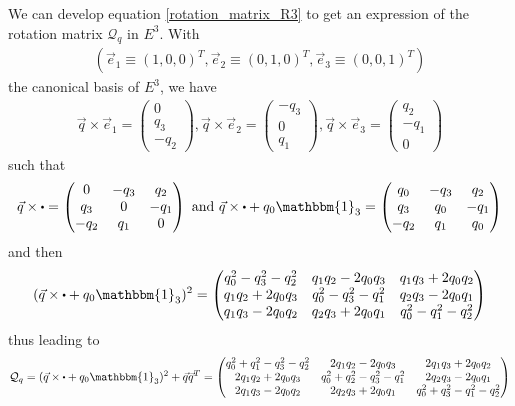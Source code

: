 \documentclass[class=report, float=false, crop=false]{standalone}
\begin{document}
We can develop equation \ref{rotation_matrix_R3} to get an expression of the rotation matrix $\mathcal{Q}_q$ in $E^3$. With
\begin{align*}
  \left(\vec{e}_1 \equiv (1, 0, 0)^T, \vec{e}_2 \equiv (0, 1, 0)^T, \vec{e}_3 \equiv (0, 0, 1)^T\right)
\end{align*}
the canonical basis of $E^3$, we have
\begin{align*}
  \vec{q} \times \vec{e}_1 = \begin{pmatrix} 0 \\ q_3 \\ -q_2 \end{pmatrix}, \vec{q} \times \vec{e}_2 = \begin{pmatrix} -q_3 \\ 0 \\ q_1 \end{pmatrix}, \vec{q} \times \vec{e}_3 = \begin{pmatrix} q_2 \\ -q_1 \\ 0 \end{pmatrix}
\end{align*}
such that
\begin{align*}
  \vec{q} \times \bigcdot = \begin{pmatrix} 0 & -q_3 & q_2 \\ q_3 & 0 & -q_1 \\ -q_2 & q_1 & 0 \end{pmatrix} \text{ and } \vec{q} \times \bigcdot + q_0 \mathbbm{1}_3 = \begin{pmatrix} q_0 & -q_3 & q_2 \\ q_3 & q_0 & -q_1 \\ -q_2 & q_1 & q_0 \end{pmatrix}
\end{align*}
and then
\begin{align*}
  (\vec{q} \times \bigcdot + q_0 \mathbbm{1}_3)^2 =
  \begin{pmatrix}
    q_0^2 - q_3^2 - q_2^2 & q_1 q_2 - 2 q_0 q_3 & q_1 q_3 + 2 q_0 q_2 \\
    q_1 q_2 + 2 q_0 q_3 & q_0^2 - q_3^2 - q_1^2 & q_2 q_3 - 2 q_0 q_1 \\
    q_1 q_3 - 2 q_0 q_2 & q_2 q_3 + 2 q_0 q_1 & q_0^2 - q_1^2 - q_2^2
  \end{pmatrix}
\end{align*}
thus leading to
\begin{align*}
  \mathcal{Q}_q = (\vec{q} \times \bigcdot + q_0 \mathbbm{1}_3)^2 + \vec{q} \vec{q}^T =
  \begin{pmatrix}
    q_0^2 + q_1^2 - q_3^2 - q_2^2 & 2 q_1 q_2 - 2 q_0 q_3 & 2 q_1 q_3 + 2 q_0 q_2 \\
    2 q_1 q_2 + 2 q_0 q_3 & q_0^2 + q_2^2 - q_3^2 - q_1^2 & 2 q_2 q_3 - 2 q_0 q_1 \\
    2 q_1 q_3 - 2 q_0 q_2 & 2 q_2 q_3 + 2 q_0 q_1 & q_0^2 + q_3^2 - q_1^2 - q_2^2
  \end{pmatrix}
\end{align*}
\end{document}
